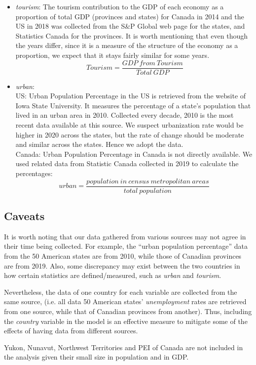 \documentclass{article}
\begin{document}
\begin{itemize}
\item \textit{tourism}: The tourism contribution to the GDP of each economy as a proportion of total GDP (provinces and states) for Canada in 2014 and the US in 2018 was collected from the S&P Global web page for the states, and Statistics Canada for the provinces. It is worth mentioning that even though the years differ, since it is a measure of the structure of the economy as a proportion, we expect that it stays fairly similar for some years.
$$ ~Tourism = \frac{GDP ~from ~Tourism}{Total ~GDP}$$
\item \textit{urban}: \\
US: Urban Population Percentage in the US is retrieved from the website of Iowa State University. It measures the percentage of a state’s population that lived in an urban area in 2010. Collected every decade, 2010 is the most recent data available at this source. We suspect urbanization rate would be higher in 2020 across the states, but the rate of change should be moderate and similar across the states. Hence we adopt the data.\\
Canada: Urban Population Percentage in Canada is not directly available. We used related data from Statistic Canada collected in 2019 to calculate the percentages:
    $$urban = \frac{population ~in~ census~ metropolitan~ areas}{total~ population}$$
\end{itemize}
 
\subsection{Caveats}
It is worth noting that our data gathered from various sources may not agree in their time being collected. For example, the “urban population percentage” data from the 50 American states are from 2010, while those of Canadian provinces are from 2019. Also, some discrepancy may exist between the two countries in how certain statistics are defined/measured, such as \textit{urban} and \textit{tourism}.

Nevertheless, the data of one country for each variable are collected from the same source, (i.e. all data 50 American states’ \textit{unemployment} rates are retrieved from one source, while that of Canadian provinces from another). Thus, including the \textit{country} variable in the model is an effective measure to mitigate some of the effects of having data from different sources.

Yukon, Nunavut, Northwest Territories and PEI of Canada are not included in the analysis given their small size in population and in GDP. 
\end{document}
